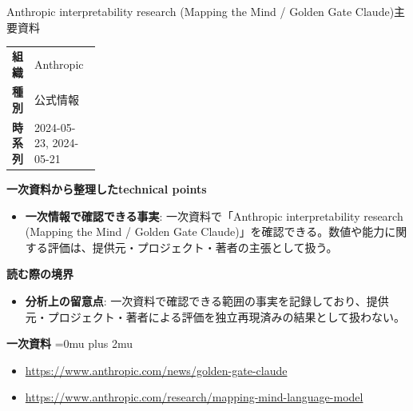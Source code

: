 \begin{technicalnote}{Anthropic interpretability research (Mapping the Mind / Golden Gate Claude)}{主要資料}
\begingroup
\begin{tabularx}{\linewidth}{@{}>{\bfseries}p{0.22\linewidth}X@{}}
組織 & Anthropic \\
種別 & 公式情報 \\
時系列 & 2024-05-23, 2024-05-21 \\
\end{tabularx}
\smallskip
{\bfseries 一次資料から整理したtechnical points}
\begin{itemize}[leftmargin=1.5em,itemsep=0.35em]
\item \textbf{一次情報で確認できる事実}: 一次資料で「Anthropic interpretability research (Mapping the Mind / Golden Gate Claude)」を確認できる。数値や能力に関する評価は、提供元・プロジェクト・著者の主張として扱う。
\end{itemize}
\begin{minipage}{\linewidth}
{\bfseries 読む際の境界}
\begin{itemize}[leftmargin=1.5em,itemsep=0.35em]
\item \textbf{分析上の留意点}: 一次資料で確認できる範囲の事実を記録しており、提供元・プロジェクト・著者による評価を独立再現済みの結果として扱わない。
\end{itemize}
\begin{samepage}
{\bfseries 一次資料}
\begingroup\sloppy
\Urlmuskip=0mu plus 2mu\relax
\begin{itemize}[leftmargin=1.5em,itemsep=0.25em]
\item {\scriptsize\url{https://www.anthropic.com/news/golden-gate-claude}}
\item {\scriptsize\url{https://www.anthropic.com/research/mapping-mind-language-model}}
\end{itemize}
\endgroup
\end{samepage}
\end{minipage}
\endgroup
\end{technicalnote}
\medskip


